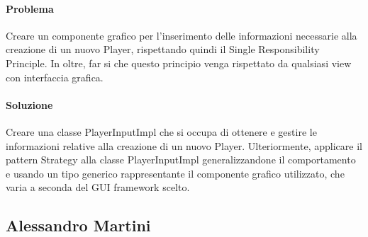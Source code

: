 \paragraph{Problema}
Creare un componente grafico per l'inserimento delle informazioni necessarie alla creazione di un nuovo Player, rispettando quindi il Single Responsibility Principle. In oltre, far si che questo principio venga rispettato da qualsiasi view con interfaccia grafica.
\paragraph{Soluzione}
Creare una classe PlayerInputImpl che si occupa di ottenere e gestire le informazioni relative alla creazione di un nuovo Player. Ulteriormente, applicare il pattern Strategy alla classe PlayerInputImpl generalizzandone il comportamento e usando un tipo generico rappresentante il componente grafico utilizzato, che varia a seconda del GUI framework scelto.
\clearpage

\subsection*{Alessandro Martini}

